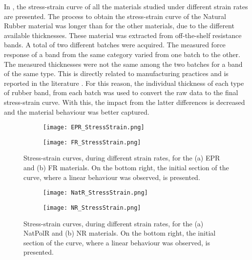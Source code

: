 In , the stress-strain curve of all the materials studied under different strain rates are presented. The process to obtain the stress-strain curve of the Natural Rubber material was longer than for the other materials, due to the different available thicknesses. These material was extracted from off-the-shelf resistance bands. A total of two different batches were acquired. The measured force response of a band from the same category varied from one batch to the other. The measured thicknesses were not the same among the two batches for a band of the same type. This is directly related to manufacturing practices and is reported in the literature \cite{case2015soft}. For this reason, the individual thickness of each type of rubber band, from each batch was used to convert the raw data to the final stress-strain curve. With this, the impact from the latter differences is decreased and the material behaviour was better captured.
\newpage
\begin{figure}[H]
    \centering
        \begin{subfigure}[b]{0.93\textwidth}
        \centering
        \texttt{[image: EPR\_StressStrain.png]}
        \caption{}
        \label{sfig:EPRSS}
    \end{subfigure}
    \begin{subfigure}[b]{0.93\textwidth}
        \centering
        \texttt{[image: FR\_StressStrain.png]}
        \caption{}
        \label{sfig:FRSS}
    \end{subfigure}
    \caption{Stress-strain curves, during different strain rates, for the (a) EPR and (b) FR materials. On the bottom right, the initial section of the curve, where a linear behaviour was observed, is presented.}
    \label{fig:EPR-FRSS}
\end{figure}
\newpage
\begin{figure}[H]
    \centering
    \begin{subfigure}[b]{0.93\textwidth}
    \centering
    \texttt{[image: NatR\_StressStrain.png]}
    \caption{}
    \label{sfig:NatRSS}
    \end{subfigure}

    \begin{subfigure}[b]{0.93\textwidth}
    \centering
    \texttt{[image: NR\_StressStrain.png]}
    \caption{}
    \label{sfig:NRSS}
    \end{subfigure}
    \caption{Stress-strain curves, during different strain rates, for the (a) NatPolR and (b) NR materials. On the bottom right, the initial section of the curve, where a linear behaviour was observed, is presented.}
    \label{fig:NatR-NRSS}
\end{figure}

